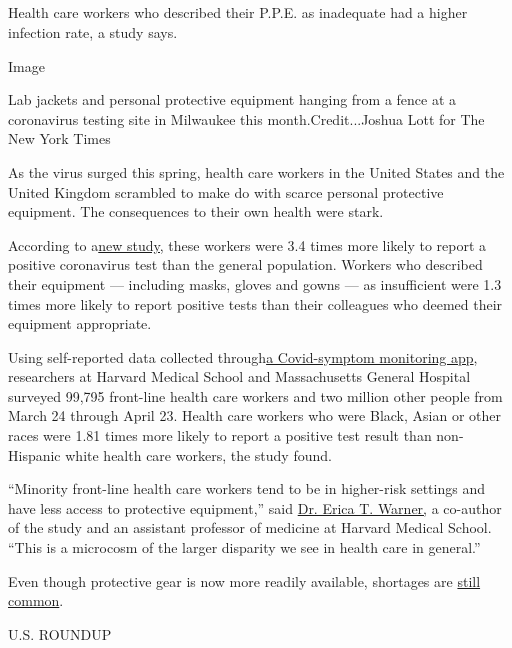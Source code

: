 \hypertarget{-8}{%
\subsection{}\label{-8}}

Health care workers who described their P.P.E. as inadequate had a
higher infection rate, a study says.

Image

Lab jackets and personal protective equipment hanging from a fence at a
coronavirus testing site in Milwaukee this month.Credit...Joshua Lott
for The New York Times

As the virus surged this spring, health care workers in the United
States and the United Kingdom scrambled to make do with scarce personal
protective equipment. The consequences to their own health were stark.

According to
a\href{https://www.thelancet.com/journals/lanpub/article/PIIS2468-2667(20)30164-X/fulltext}{new
study,} these workers were 3.4 times more likely to report a positive
coronavirus test than the general population. Workers who described
their equipment --- including masks, gloves and gowns --- as
insufficient were 1.3 times more likely to report positive tests than
their colleagues who deemed their equipment appropriate.

Using self-reported data collected
through\href{https://covid.joinzoe.com/us}{a Covid-symptom monitoring
app}, researchers at Harvard Medical School and Massachusetts General
Hospital surveyed 99,795 front-line health care workers and two million
other people from March 24 through April 23. Health care workers who
were Black, Asian or other races were 1.81 times more likely to report a
positive test result than non-Hispanic white health care workers, the
study found.

``Minority front-line health care workers tend to be in higher-risk
settings and have less access to protective equipment,'' said
\href{https://cgvh.harvard.edu/people/erica-warner}{Dr. Erica T.
Warner,} a co-author of the study and an assistant professor of medicine
at Harvard Medical School. ``This is a microcosm of the larger disparity
we see in health care in general.''

Even though protective gear is now more readily available, shortages are
\href{https://www.nytimes.com/2020/07/08/health/coronavirus-masks-ppe-doc.html}{still
common}.

U.S. ROUNDUP

\hypertarget{-9}{%
\subsection{}\label{-9}}

